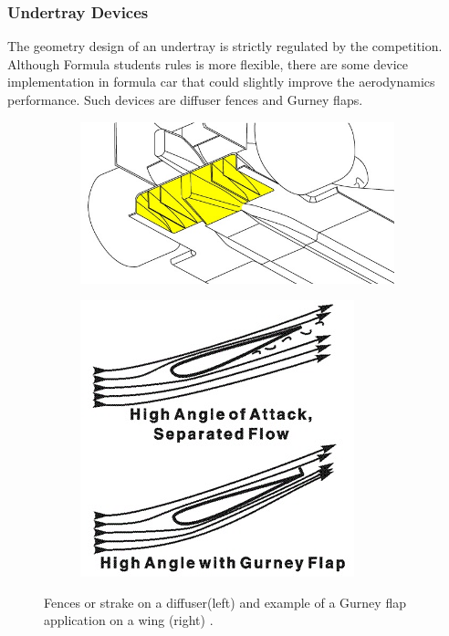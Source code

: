 \subsubsection{Undertray Devices}
The geometry design of an undertray is strictly regulated by the competition. Although Formula students rules is more flexible, there are some device implementation in formula car that could slightly improve the aerodynamics performance. Such devices are diffuser fences and Gurney flaps.

\begin{figure}[!ht]
\begin{center}
%    
  \begin{subfigure}[b]{0.4\textwidth}
    \includegraphics[scale=0.6]{Figures/diffuser_fences.jpg}
  \end{subfigure}
  \begin{subfigure}[b]{0.4\textwidth}
    \includegraphics[scale=0.8]{Figures/Gurney.jpg}
  \end{subfigure}
%  
  \caption{Fences or strake on a diffuser(left) and example of a Gurney flap application on a wing (right) \cite{Anonymous2020GurneyFlap}.}
    \label{fig:gurney}
\end{center}
\end{figure}

